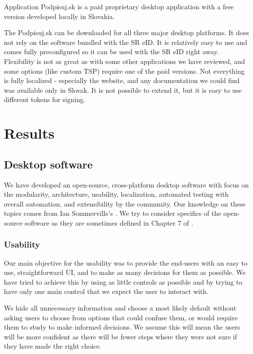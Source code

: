\documentclass[thesismargins, english, thesislinespacing, onelinechapterstyle, upjsfrontpage]{rnthesis}
\begin{document}
Application Podpisuj.sk is a paid proprietary desktop application with a free version developed locally in Slovakia.


The Podpisuj.sk can be downloaded for all three major desktop platforms.
It does not rely on the software bundled with the SR eID.
It is relatively easy to use and comes fully preconfigured so it can be used with the SR eID right away.
Flexibility is not as great as with some other applications we have reviewed, and some options (like custom TSP) require one of the paid versions.
Not everything is fully localized - especially the website, and any documentation we could find was available only in Slovak.
It is not possible to extend it, but it is easy to use different tokens for signing.

\chapter{Results}

\section{Desktop software}

We have developed an open-source, cross-platform desktop software with focus on the modularity, architecture, usability, localization, automated testing with overall automation, and extensibility by the community.
Our knowledge on these topics comes from Ian Sommerville's \cite{sommerville}.
We try to consider specifics of the open-source software as they are sometimes defined in Chapter 7 of \cite{oss}.

\subsection{Usability}

Our main objective for the usability was to provide the end-users with an easy to use, straightforward UI, and to make as many decisions for them as possible.
We have tried to achieve this by using as little controls as possible and by trying to have only one main control that we expect the user to interact with.


We hide all unnecessary information and choose a most likely default without asking users to choose from options that could confuse them, or would require them to study to make informed decisions.
We assume this will mean the users will be more confident as there will be fewer steps where they were not sure if they have made the right choice.
\end{document}
